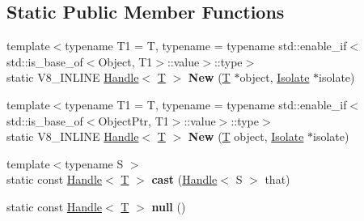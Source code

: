 \subsection*{Static Public Member Functions}
\begin{DoxyCompactItemize}
\item 
\mbox{\label{classv8_1_1internal_1_1Handle_a9652a13a5b281a06424a7dc65230a8b6}} 
{\footnotesize template$<$typename T1  = T, typename  = typename std\+::enable\+\_\+if$<$                                 std\+::is\+\_\+base\+\_\+of$<$\+Object, T1$>$\+::value$>$\+::type$>$ }\\static V8\+\_\+\+I\+N\+L\+I\+NE \mbox{\hyperlink{classv8_1_1internal_1_1Handle}{Handle}}$<$ \mbox{\hyperlink{classv8_1_1internal_1_1torque_1_1T}{T}} $>$ {\bfseries New} (\mbox{\hyperlink{classv8_1_1internal_1_1torque_1_1T}{T}} $\ast$object, \mbox{\hyperlink{classv8_1_1internal_1_1Isolate}{Isolate}} $\ast$isolate)
\item 
\mbox{\label{classv8_1_1internal_1_1Handle_a37ffdf94b304974cf7518dc2dc00b3de}} 
{\footnotesize template$<$typename T1  = T, typename  = typename std\+::enable\+\_\+if$<$                                 std\+::is\+\_\+base\+\_\+of$<$\+Object\+Ptr, T1$>$\+::value$>$\+::type$>$ }\\static V8\+\_\+\+I\+N\+L\+I\+NE \mbox{\hyperlink{classv8_1_1internal_1_1Handle}{Handle}}$<$ \mbox{\hyperlink{classv8_1_1internal_1_1torque_1_1T}{T}} $>$ {\bfseries New} (\mbox{\hyperlink{classv8_1_1internal_1_1torque_1_1T}{T}} object, \mbox{\hyperlink{classv8_1_1internal_1_1Isolate}{Isolate}} $\ast$isolate)
\item 
\mbox{\label{classv8_1_1internal_1_1Handle_ab79a98e1b94c7e002f2bb24dcae11ca7}} 
{\footnotesize template$<$typename S $>$ }\\static const \mbox{\hyperlink{classv8_1_1internal_1_1Handle}{Handle}}$<$ \mbox{\hyperlink{classv8_1_1internal_1_1torque_1_1T}{T}} $>$ {\bfseries cast} (\mbox{\hyperlink{classv8_1_1internal_1_1Handle}{Handle}}$<$ S $>$ that)
\item 
\mbox{\label{classv8_1_1internal_1_1Handle_a5370e41511ebb3dd59333d20f35fe9ab}} 
static const \mbox{\hyperlink{classv8_1_1internal_1_1Handle}{Handle}}$<$ \mbox{\hyperlink{classv8_1_1internal_1_1torque_1_1T}{T}} $>$ {\bfseries null} ()
\end{DoxyCompactItemize}
